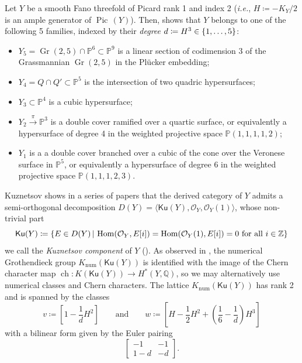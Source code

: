 \documentclass[11pt]{amsart}
\theoremstyle{definition}
\newcommand{\Z}{\mathbb{Z}}
\newcommand{\Q}{\mathbb{Q}}
\newcommand{\pr}[1]{\mathbb P^{#1}}
\DeclareMathOperator{\Hom}{Hom}
\DeclareMathOperator{\Ch}{ch}
\DeclareMathOperator{\Gr}{Gr}
\DeclareMathOperator{\Pic}{Pic\,}
\newcommand{\sO}{\mathcal{O}}
\newcommand{\st}{\,|\,}					%
\DeclarePairedDelimiter{\set}{\lbrace}{\rbrace}
\newcommand{\Ku}{\mathsf{Ku}}
\begin{document}
Let $Y$ be a smooth Fano threefold of Picard rank 1 and index 2  (\textit{i.e.}, $H\coloneqq -K_Y/2$ is an ample generator of $\Pic(Y)$). Then, \cite{Isk77} shows that $Y$ belongs to one of the following 5 families, indexed by their \textit{degree} $d\coloneqq H^3\in\set{1,\ldots,5}$:
\begin{itemize}
\item $Y_5= \Gr(2,5) \cap \pr 6 \subset \pr 9$ is a linear section of codimension 3 of the Grassmannian $\Gr(2,5)$ in the Pl\"ucker embedding;
\item $Y_4 = Q \cap Q' \subset \pr 5$ is the intersection of two quadric hypersurfaces;
\item $Y_3 \subset \pr 4$ is a cubic hypersurface;
\item $Y_2 \xrightarrow{\pi} \pr 3$ is a double cover ramified over a quartic surface, or equivalently a hypersurface of degree 4 in the weighted projective space $\mathbb P(1,1,1,1,2)$;
\item $Y_1$ is a a double cover branched over a cubic of the cone over the Veronese surface in $\pr 5$, or equivalently a hypersurface of degree 6 in the weighted projective space $\mathbb P(1,1,1,2,3)$.
\end{itemize}

Kuznetsov shows in a series of papers that the derived category of $Y$ admits a semi-orthogonal decomposition $D(Y)=\langle \Ku(Y), \sO_Y, \sO_Y(1) \rangle$, whose non-trivial part 
\begin{equation}
    \label{eq_def_of_Ku}
\Ku(Y)\coloneqq \set{E\in D(Y) \st \Hom(\sO_Y,E[i])=\Hom(\sO_Y(1),E[i])=0 \mbox{ for all }i\in \Z}  
\end{equation}
we call the \textit{Kuznetsov component} of $Y$ (\cite{Kuz09_threefolds, Kuz14}). As observed in \cite[Proposition~3.9]{Kuz09_threefolds}, the numerical Grothendieck group $K_{\text{num}}(\Ku(Y))$ is identified with the image of the Chern character map $\Ch: K(\Ku(Y))\to H^\ast(Y,\Q)$, so we may alternatively use numerical classes and Chern characters. The lattice $K_{\text{num}}(\Ku(Y))$ has rank 2 and is spanned by the classes 
\begin{equation}
    \label{eq_def_of_v_w}
v\coloneqq \left[ 1-\dfrac{1}{d}H^2\right] \qquad \mbox{and} \qquad w\coloneqq \left[ H -\dfrac{1}{2}H^2+\left(\dfrac{1}{6}-\dfrac{1}{d}\right)H^3  \right]
\end{equation}
with a bilinear form given by the Euler pairing
\[
\begin{bmatrix}
-1 & -1 \\
1-d & -d
\end{bmatrix}.
\]
\end{document}

